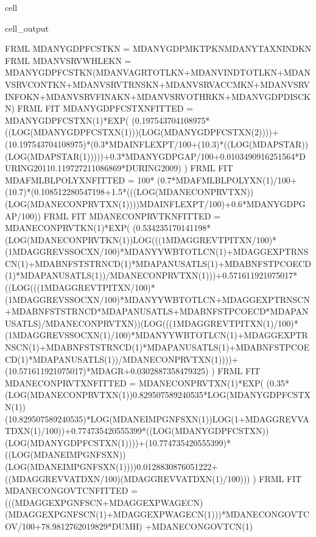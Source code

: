 \documentclass[letterpaper,10pt,english]{jupyterBook}
\begin{document}
\begin{sphinxuseclass}{cell}
\begin{sphinxVerbatimOutput}
\begin{sphinxuseclass}{cell_output}
\begin{sphinxVerbatim}[commandchars=\\\{\}]
FRML  \PYGZlt{}\PYGZgt{} MDANYGDPFCSTKN = MDANYGDPMKTPKN\PYGZhy{}MDANYTAXNINDKN \PYGZdl{}
FRML  \PYGZlt{}\PYGZgt{} MDANVSRVWHLEKN = MDANYGDPFCSTKN\PYGZhy{}(MDANVAGRTOTLKN+MDANVINDTOTLKN+MDANVSRVCONTKN+MDANVSRVTRNSKN+MDANVSRVACCMKN+MDANVSRVINFOKN+MDANVSRVFINAKN+MDANVSRVOTHRKN+MDANVGDPDISCKN) \PYGZdl{}
FRML \PYGZlt{}FIT\PYGZgt{} MDANYGDPFCSTXN\PYGZus{}FITTED = MDANYGDPFCSTXN(\PYGZhy{}1)*EXP( (0.197543704108975*((LOG(MDANYGDPFCSTXN(\PYGZhy{}1)))\PYGZhy{}(LOG(MDANYGDPFCSTXN(\PYGZhy{}2))))+(1\PYGZhy{}0.197543704108975)*(0.3*MDAINFLEXPT/100+(1\PYGZhy{}0.3)*((LOG(MDAPSTAR))\PYGZhy{}(LOG(MDAPSTAR(\PYGZhy{}1)))))+0.3*MDANYGDPGAP\PYGZus{}/100+0.0103490916251564*DURING\PYGZus{}2011\PYGZhy{}0.119727211086869*DURING\PYGZus{}2009) ) \PYGZdl{}
FRML \PYGZlt{}FIT\PYGZgt{} MDAFMLBLPOLYXN\PYGZus{}FITTED = 100* (0.7*MDAFMLBLPOLYXN(\PYGZhy{}1)/100+(1\PYGZhy{}0.7)*(0.108512280547198+1.5*(((LOG(MDANECONPRVTXN))\PYGZhy{}(LOG(MDANECONPRVTXN(\PYGZhy{}1))))\PYGZhy{}MDAINFLEXPT/100)+0.6*MDANYGDPGAP\PYGZus{}/100))  \PYGZdl{}
FRML \PYGZlt{}FIT\PYGZgt{} MDANECONPRVTKN\PYGZus{}FITTED = MDANECONPRVTKN(\PYGZhy{}1)*EXP( (\PYGZhy{}0.534235170141198*(LOG(MDANECONPRVTKN(\PYGZhy{}1))\PYGZhy{}LOG(((1\PYGZhy{}MDAGGREVTPITXN/100)*(1\PYGZhy{}MDAGGREVSSOCXN/100)*MDANYYWBTOTLCN(\PYGZhy{}1)+MDAGGEXPTRNSCN(\PYGZhy{}1)+MDABNFSTSTRNCD(\PYGZhy{}1)*MDAPANUSATLS(\PYGZhy{}1)+MDABNFSTPCOECD(\PYGZhy{}1)*MDAPANUSATLS(\PYGZhy{}1))/MDANECONPRVTXN(\PYGZhy{}1)))+0.571611921075017*((LOG(((1\PYGZhy{}MDAGGREVTPITXN/100)*(1\PYGZhy{}MDAGGREVSSOCXN/100)*MDANYYWBTOTLCN+MDAGGEXPTRNSCN+MDABNFSTSTRNCD*MDAPANUSATLS+MDABNFSTPCOECD*MDAPANUSATLS)/MDANECONPRVTXN))\PYGZhy{}(LOG(((1\PYGZhy{}MDAGGREVTPITXN(\PYGZhy{}1)/100)*(1\PYGZhy{}MDAGGREVSSOCXN(\PYGZhy{}1)/100)*MDANYYWBTOTLCN(\PYGZhy{}1)+MDAGGEXPTRNSCN(\PYGZhy{}1)+MDABNFSTSTRNCD(\PYGZhy{}1)*MDAPANUSATLS(\PYGZhy{}1)+MDABNFSTPCOECD(\PYGZhy{}1)*MDAPANUSATLS(\PYGZhy{}1))/MDANECONPRVTXN(\PYGZhy{}1))))+(1\PYGZhy{}0.571611921075017)*MDAGR+0.0302887358479325) ) \PYGZdl{}
FRML \PYGZlt{}FIT\PYGZgt{} MDANECONPRVTXN\PYGZus{}FITTED = MDANECONPRVTXN(\PYGZhy{}1)*EXP( (\PYGZhy{}0.35*(LOG(MDANECONPRVTXN(\PYGZhy{}1))\PYGZhy{}0.829507589240535*LOG(MDANYGDPFCSTXN(\PYGZhy{}1))\PYGZhy{}(1\PYGZhy{}0.829507589240535)*LOG(MDANEIMPGNFSXN(\PYGZhy{}1))\PYGZhy{}LOG(1+MDAGGREVVATDXN(\PYGZhy{}1)/100))+0.774735420555399*((LOG(MDANYGDPFCSTXN))\PYGZhy{}(LOG(MDANYGDPFCSTXN(\PYGZhy{}1))))+(1\PYGZhy{}0.774735420555399)*((LOG(MDANEIMPGNFSXN))\PYGZhy{}(LOG(MDANEIMPGNFSXN(\PYGZhy{}1))))\PYGZhy{}0.0128830876051222+((MDAGGREVVATDXN/100)\PYGZhy{}(MDAGGREVVATDXN(\PYGZhy{}1)/100))) ) \PYGZdl{}
FRML \PYGZlt{}FIT\PYGZgt{} MDANECONGOVTCN\PYGZus{}FITTED =  (((MDAGGEXPGNFSCN+MDAGGEXPWAGECN)\PYGZhy{}(MDAGGEXPGNFSCN(\PYGZhy{}1)+MDAGGEXPWAGECN(\PYGZhy{}1)))*MDANECONGOVTCOV\PYGZus{}/100+78.9812762019829*DUMH) +MDANECONGOVTCN(\PYGZhy{}1) \PYGZdl{}

\end{sphinxVerbatim}
\end{sphinxuseclass}
\end{sphinxVerbatimOutput}
\end{sphinxuseclass}
\end{document}
